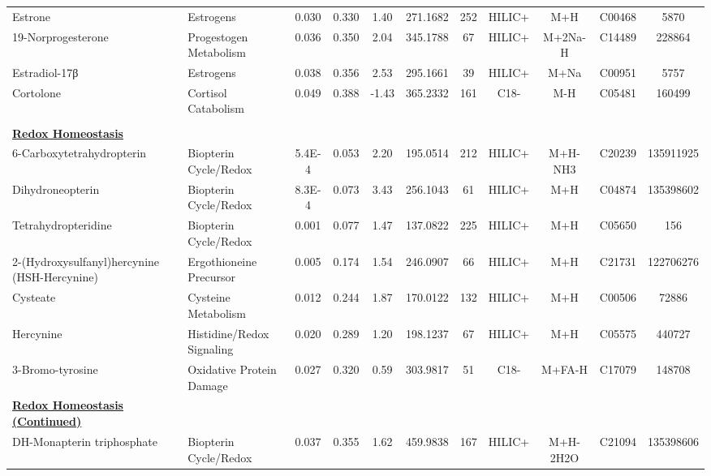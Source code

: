 \begin{longtable}[t]{llccccccccc}
\hspace*{0.3cm}Estrone & Estrogens & 0.030 & 0.330 & 1.40 & 271.1682 & 252 & HILIC+ & M+H & C00468 & 5870\\
\hspace*{0.3cm}19-Norprogesterone & Progestogen Metabolism & 0.036 & 0.350 & 2.04 & 345.1788 & 67 & HILIC+ & M+2Na-H & C14489 & 228864\\
\hspace*{0.3cm}Estradiol-17β & Estrogens & 0.038 & 0.356 & 2.53 & 295.1661 & 39 & HILIC+ & M+Na & C00951 & 5757\\
\hspace*{0.3cm}Cortolone & Cortisol Catabolism & 0.049 & 0.388 & -1.43 & 365.2332 & 161 & C18- & M-H & C05481 & 160499\\
 &  &  &  &  &  &  &  &  &  & \\

\fontsize{9pt}{10.8pt}\selectfont\textbf{\underline{Redox Homeostasis}} &  &  &  &  &  &  &  &  &  & \\
\hspace*{0.3cm}6-Carboxytetrahydropterin & Biopterin Cycle/Redox & 5.4E-4 & 0.053 & 2.20 & 195.0514 & 212 & HILIC+ & M+H-NH3 & C20239 & 135911925\\
\hspace*{0.3cm}Dihydroneopterin & Biopterin Cycle/Redox & 8.3E-4 & 0.073 & 3.43 & 256.1043 & 61 & HILIC+ & M+H & C04874 & 135398602\\
\hspace*{0.3cm}Tetrahydropteridine & Biopterin Cycle/Redox & 0.001 & 0.077 & 1.47 & 137.0822 & 225 & HILIC+ & M+H & C05650 & 156\\
\hspace*{0.3cm}2-(Hydroxysulfanyl)hercynine (HSH-Hercynine) & Ergothioneine Precursor & 0.005 & 0.174 & 1.54 & 246.0907 & 66 & HILIC+ & M+H & C21731 & 122706276\\

\hspace*{0.3cm}Cysteate & Cysteine Metabolism & 0.012 & 0.244 & 1.87 & 170.0122 & 132 & HILIC+ & M+H & C00506 & 72886\\
\hspace*{0.3cm}Hercynine & Histidine/Redox Signaling & 0.020 & 0.289 & 1.20 & 198.1237 & 67 & HILIC+ & M+H & C05575 & 440727\\
\hspace*{0.3cm}3-Bromo-tyrosine & Oxidative Protein Damage & 0.027 & 0.320 & 0.59 & 303.9817 & 51 & C18- & M+FA-H & C17079 & 148708\\
\fontsize{9pt}{10.8pt}\selectfont\textbf{\underline{Redox Homeostasis (Continued)}} &  &  &  &  &  &  &  &  &  & \\
\hspace*{0.3cm}DH-Monapterin triphosphate & Biopterin Cycle/Redox & 0.037 & 0.355 & 1.62 & 459.9838 & 167 & HILIC+ & M+H-2H2O & C21094 & 135398606\\


\end{longtable}
